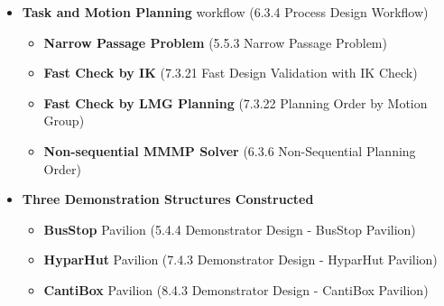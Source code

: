 \begin{itemize}
	\item \textbf{Task and Motion Planning }workflow (6.3.4 Process Design Workflow)

\begin{itemize}
	\item \textbf{Narrow Passage Problem }(5.5.3 Narrow Passage Problem)

	\item \textbf{Fast Check by IK} (7.3.21 Fast Design Validation with IK Check)

	\item \textbf{Fast Check by LMG Planning} (7.3.22 Planning Order by Motion Group)

	\item \textbf{Non-sequential MMMP Solver} (6.3.6 Non-Sequential Planning Order)

\end{itemize}
	\item \textbf{Three Demonstration Structures Constructed}

\begin{itemize}
	\item \textbf{BusStop }Pavilion (5.4.4 Demonstrator Design - BusStop Pavilion)

	\item \textbf{HyparHut }Pavilion (7.4.3 Demonstrator Design  - HyparHut Pavilion)

	\item \textbf{CantiBox }Pavilion (8.4.3 Demonstrator Design  - CantiBox Pavilion)

\end{itemize}
\end{itemize}
